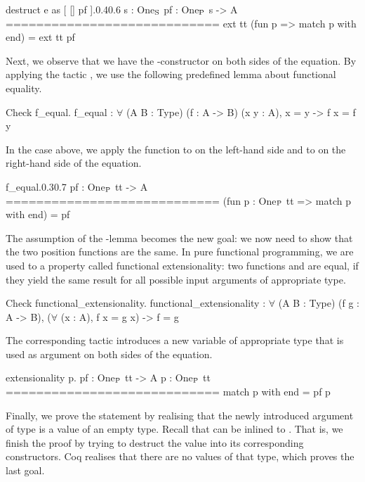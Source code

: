 \begin{cproof1}{destruct e as [ [] pf ].}{0.4}{0.6}
  s : One\(\sb{\text{S}}\)
  pf : One\(\sb{\text{P}}\) s -> A
  ============================
  ext tt (fun p => match p with end) =
  ext tt pf
\end{cproof1}

Next, we observe that we have the \--constructor on both sides of the equation.
By applying the tactic , we use the following predefined lemma about functional equality.

\begin{crepl}
\coqrepl Check f_equal.
  f_equal : \(\forall\) (A B : Type) (f : A -> B) (x y : A), x = y -> f x = f y
\end{crepl}

In the case above, we apply the function  to  on the left\--hand side and to  on the right\--hand side of the equation.
 
\begin{cproof1}{f_equal.}{0.3}{0.7}
  pf : One\(\sb{\text{P}}\) tt -> A
  ============================
  (fun p : One\(\sb{\text{P}}\) tt => match p with end) = pf
\end{cproof1}

The assumption of the \--lemma becomes the new goal: we now need to show that the two position functions are the same.
In pure functional programming, we are used to a property called functional extensionality: two functions  and  are equal, if they yield the same result for all possible input arguments of appropriate type.

\begin{crepl}
\coqrepl Check  functional_extensionality.
  functional_extensionality : \(\forall\) (A B : Type) (f g : A -> B),
    (\(\forall\) (x : A), f x = g x) -> f = g
\end{crepl}

The corresponding tactic  introduces a new variable  of appropriate type that is used as argument on both sides of the equation.

\begin{cproof}{extensionality p.}
  pf : One\(\sb{\text{P}}\) tt -> A
  p : One\(\sb{\text{P}}\) tt
  ============================
  match p with end = pf p
\end{cproof}

Finally, we prove the statement by realising that the newly introduced argument  of type  is a value of an empty type.
Recall that  can be inlined to .
That is, we finish the proof by trying to destruct the value  into its corresponding constructors.
Coq realises that there are no values of that type, which proves the last goal.


